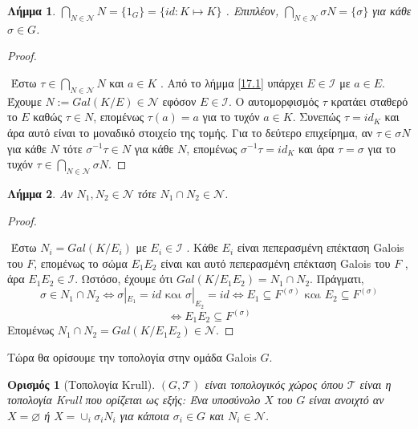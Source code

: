 \documentclass[oneside,a4paper]{article}
\newtheorem{lemma}{Λήμμα}
\newtheorem*{defn}{Ορισμός}
\newcommand {\tl}{\textlatin}
\begin{document}
\begin{lemma} \label{17.3}  $\bigcap_{N \in \mathcal{N}} N= \{1_G \} = \{ id: K \mapsto K \}$ . Επιπλέον, $\bigcap_{N \in \mathcal{N}} \sigma N = \{\sigma \}$ για κάθε $\sigma \in G$.
\end{lemma}
\begin{proof} $ $

$ $\newline	
Έστω $\tau \in \bigcap_{N \in \mathcal{N}} N$ και $a \in K$ . Από το λήμμα \ref{17.1} υπάρχει  $E \in \mathcal{I}$ με $a \in E$. Έχουμε $N := Gal(K/E) \in \mathcal{N}$ εφόσον $E \in \mathcal{I}$. Ο αυτομορφισμός $\tau$ κρατάει σταθερό το $E$ καθώς $\tau \in N$, επομένως $\tau (a) = a$ για το τυχόν $a \in K$. Συνεπώς $\tau = id_K$ και άρα αυτό είναι το μοναδικό στοιχείο της τομής. Για το δεύτερο επιχείρημα, αν $\tau \in \sigma N$ για κάθε $N$ τότε $\sigma^{-1} \tau \in N$ για κάθε $N$, επομένως $\sigma^{-1} \tau = id_K$ και άρα $\tau = \sigma$ για το τυχόν $\tau \in \bigcap_{N \in \mathcal{N}} \sigma N$.
\end{proof}

\begin{lemma} \label{17.4} Αν $N_1 , N_2 \in \mathcal{N}$ τότε $N_1 \cap N_2 \in \mathcal{N}$.
\end{lemma}
\begin{proof} $ $


$ $\newline
Έστω $N_i = Gal(K/E_i)$ με $E_i \in \mathcal{I}$ . Κάθε $E_i$ είναι πεπερασμένη επέκταση \tl{Galois} του $F$, επομένως το σώμα $E_1 E_2$ είναι και αυτό πεπερασμένη επέκταση \tl{Galois} του $F$ , άρα $E_1 E_2 \in \mathcal{I}$. Ωστόσο, έχουμε ότι $Gal(K/E_1 E_2) = N_1 \cap N_2$. Πράγματι,
$$\sigma \in N_1 \cap N_2 \iff \sigma|_{E_1} = id \text{ και } \sigma|_{E_2}=id \iff E_1 \subseteq F^{(\sigma)} \text{ και } E_2 \subseteq F^{(\sigma)}$$
$$\iff E_1 E_2 \subseteq F^{(\sigma)}$$
Επομένως $N_1 \cap N_2 = Gal(K/E_1 E_2) \in \mathcal{N}$.
\end{proof}

\noindent Τώρα θα ορίσουμε την τοπολογία στην ομάδα \tl{Galois} $G$.

\begin{defn}[Τοπολογία \tl{Krull}] $(G,\mathcal{T})$ είναι τοπολογικός χώρος όπου $\mathcal{T}$ είναι η τοπολογία \tl{Krull} που ορίζεται ως εξής:
Ένα υποσύνολο $X$ του $G$ είναι ανοιχτό αν $X=\varnothing$ ή $X= \cup_i \sigma_i N_i$ για κάποια $\sigma_i \in G$ και $N_i \in \mathcal{N}$.
\end{defn}
\end{document}
